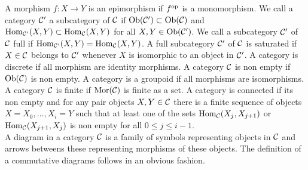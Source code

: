 A morphism $f : X \longrightarrow Y$ is an epimorphism if $f^{\mathrm{op}}$ is a monomorphism.
We call a category $\mathcal{C}'$ a subcategory of $\mathcal{C}$ if $\mathrm{Ob}(\mathcal{C}') \subset \mathrm{Ob}(\mathcal{C})$ and $\mathrm{Hom}_{\mathcal{C}'}(X,Y) \subset \mathrm{Hom}_{\mathcal{C}}(X,Y)$ for all $X, Y \in \mathrm{Ob}(\mathcal{C}')$. We call a subcategory $\mathcal{C}'$ of $\mathcal{C}$ full if $\mathrm{Hom}_{\mathcal{C}'}(X,Y) = \mathrm{Hom}_{\mathcal{C}}(X,Y)$. A full subcategory $\mathcal{C}'$ of $\mathcal{C}$ is saturated if $X \in \mathcal{C}$ belongs to $\mathcal{C}'$ whenever $X$ is isomorphic to an object in $\mathcal{C}'$. A category is discrete if all morphism are identity morphisms. A category $\mathcal{C}$ is non empty if $\mathrm{Ob}(\mathcal{C})$ is non empty. A category is a groupoid if all morphisms are isomorphisms. A category $\mathcal{C}$ is finite if $\mathrm{Mor}(\mathcal{C})$ is finite as a set. A category is connected if its non empty and for any pair objects $X, Y \in \mathcal{C}$ there is a finite sequence of objects $X = X_0, \ldots, X_i = Y$ such that at least one of the sets $\mathrm{Hom}_{\mathcal{C}}(X_j,X_{j+1})$ or $\mathrm{Hom}_{\mathcal{C}}(X_{j+1},X_j)$ is non empty for all $0 \leq j \leq i - 1$.\\
\indent A diagram in a category $\mathcal{C}$ is a family of symbols representing objects in $\mathcal{C}$ and arrows betweens these representing morphisms of these objects. The definition of a commutative diagrams follows in an obvious fashion.
\bsp 
